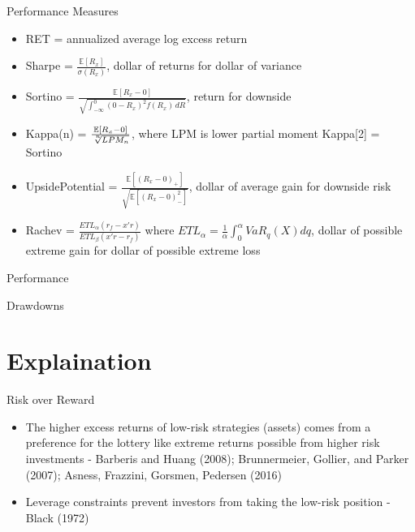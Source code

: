 \documentclass{beamer}
\begin{document}
\begin{frame}{Performance Measures}
	\begin{itemize}[<+->]
		\item RET = annualized average log excess return
		\item Sharpe = $\frac{\mathbb{E}[R_{x}]}{\sigma(R_{x})}$, dollar of returns for dollar of variance
		\item Sortino = $\frac{\mathbb{E}[R_{x} - 0]}{\sqrt  {\int _{{-\infty }}^{0}(0-R_{x})^{2}f(R_{x})\,dR}}$, return for downside
		\item Kappa(n) = $\frac{\mathbb{E}[R_{x} - 0]}{\sqrt[\leftroot{-2}\uproot{2}n]{LPM_{n}}}$, where LPM is lower partial moment Kappa[2] = Sortino
		\item UpsidePotential = $\frac {\mathbb {E} [(R_{x}-0)_{+}]}{\sqrt {\mathbb {E} [(R_{x}-0)_{-}^{2}]}}$, dollar of average gain for downside risk
		\item Rachev = $\frac {ET{L_{\alpha }}\left({{r_{f}}-x'r}\right)}{ET{L_{\beta }}\left({x'r-{r_{f}}}\right)}$ where $ET{L_{\alpha }}={\frac {1}{\alpha }}\int _{0}^{\alpha }{Va{R_{q}}\left(X\right)dq}$, dollar of possible extreme gain for dollar of possible extreme loss
	\end{itemize}
\end{frame}

\begin{frame}{Performance}
	\begin{adjustbox}{width=\textwidth}
		
	\end{adjustbox}
\end{frame}

\begin{frame}{Drawdowns}
	\begin{adjustbox}{width=\textwidth}
		
	\end{adjustbox}
	\begin{adjustbox}{width=\textwidth}
		
	\end{adjustbox}
\end{frame}

\section{Explaination}
\begin{frame}{Risk over Reward}
	\begin{itemize}[<+->]
		\item The higher excess returns of low-risk strategies (assets) comes from a preference for the lottery like extreme returns possible from higher risk investments - Barberis and Huang (2008); Brunnermeier, Gollier, and Parker (2007); Asness, Frazzini, Gorsmen, Pedersen (2016)
		\item Leverage constraints prevent investors from taking the low-risk position - Black (1972)
	\end{itemize}
\end{frame}
\end{document}
